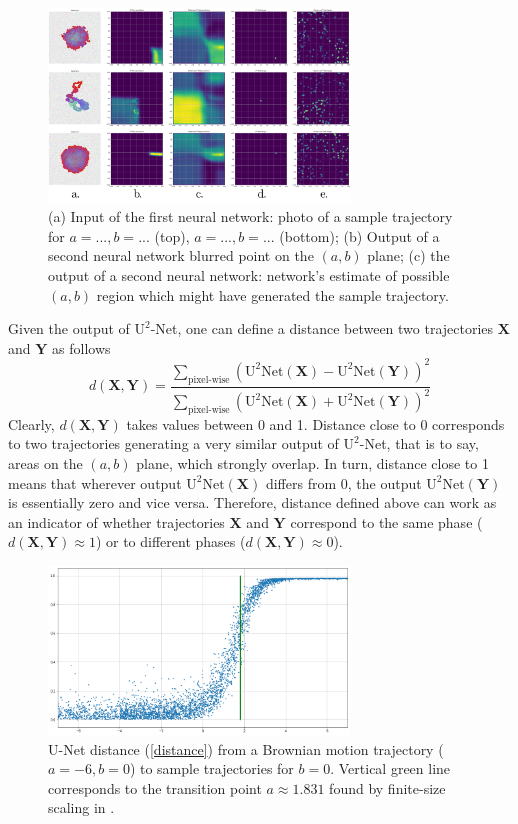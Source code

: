 \documentclass[aps,a4paper,twocolumn,showpacs]{revtex4}
\newcommand{\eq}[1]{(\ref{#1})}
\newcommand{\be}{\begin{equation}}
\newcommand{\ee}{\end{equation}}
\newcommand{\ve}{\mathbf}
\begin{document}
\begin{figure}[ht]
\includegraphics[width=8cm]{Fig2_input_output_example.png}
\caption{(a) Input of the first neural network: photo of a sample trajectory for $a =..., b = ...$ (top), $a =..., b = ...$ (bottom); (b) Output of a second neural network blurred point on the $(a,b)$ plane; (c) the output of a second neural network: network's estimate of possible $(a,b)$ region which might have generated the sample trajectory.}
\label{fig02}
\end{figure}

Given the output of $\text{U}^{2}$-Net, one can define a distance between two trajectories $\ve X$ and $\ve Y$ as follows
\be
\displaystyle d(\ve X, \ve Y) =  \frac{\sum_{\text{pixel-wise}}\left(\text{U}^{2}\text{Net}(\ve X)-\text{U}^{2}\text{Net}(\ve Y)\right)^2}{\sum_{\text{pixel-wise}}\left(\text{U}^{2}\text{Net}(\ve X)+\text{U}^{2}\text{Net}(\ve Y)\right)^2}
\label{distance}
\ee
Clearly, $d(\ve X, \ve Y)$ takes values between 0 and 1. Distance close to 0 corresponds to two trajectories generating a very similar output of $\text{U}^{2}$-Net, that is to say, areas on the $(a,b)$ plane, which strongly overlap. In turn, distance close to 1 means that wherever output $\text{U}^{2}\text{Net}(\ve X)$ differs from 0, the output $\text{U}^{2}\text{Net}(\ve Y)$ is essentially zero and vice versa. Therefore, distance defined above can work as an indicator of whether trajectories $\ve X$ and $\ve Y$ correspond to the same phase ($d(\ve X, \ve Y)\approx 1$) or to different phases  ($d(\ve X, \ve Y)\approx 0$). 

\begin{figure}[ht]
\includegraphics[width=8cm]{Fig3_reproduction_of_foster_results_for_phase_transition.png}
\caption{U-Net distance \eq{distance} from a Brownian motion trajectory ($a=-6, b=0$) to sample trajectories for $b=0$. Vertical green line corresponds to the transition point $a \approx 1.831$ found by finite-size scaling in \cite{ordemann1}.}
\label{fig03}
\end{figure}
\end{document}
